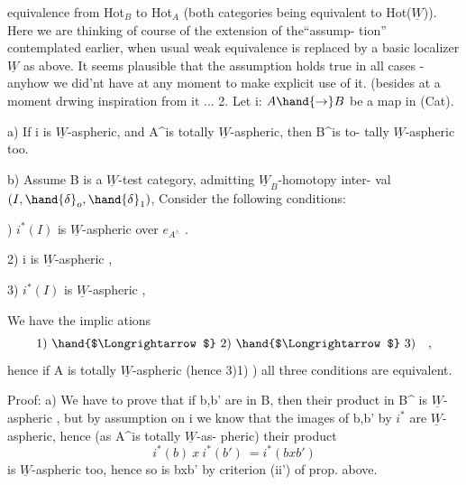 equivalence from Hot$_B$ to Hot$_A$  (both categories being equivalent to
Hot($\underline{W}$)).  Here we are thinking of course of the extension of the``assump-%
tion'' contemplated earlier,  when usual weak equivalence is replaced by
a basic localizer $\underline{W}$ as above.  It seems plausible that the assumption
holds true in all cases  -  anyhow we did'nt have at any moment to make
explicit use of it. (besides at a moment drwing inspiration from it ...\hand{)}
\hand{\uline{\textcolor{black}{Proposition}}} 2.   Let  i: $A\hand{\to} B$ be a map in (Cat).

a)  If i is $\underline{W}$-aspheric,  and A\^{}is totally $\underline{W}$-aspheric,  then B\^{}is to-%
tally $\underline{W}$-aspheric too.

b)  Assume  B is a $\underline{W}$-test category,  admitting   $\underline{W}_B$-homotopy  inter-%
val$(I,\hand{\delta}_o,\hand{\delta}_1)$,  Consider the following conditions:

)  $i^*(I)$ is $\underline{W}$-aspheric over $e_{A^\wedge}$ . 

2)  i is $\underline{W}$-aspheric ,

3)  $i^*(I)$  is $\underline{W}$-aspheric ,  

We have the implic ations
\[ 1)\ \hand{$\Longrightarrow$}\ 2)\ \hand{$\Longrightarrow$}\ 3) \quad , \]
hence if A is totally $\underline{W}$-aspheric (hence  3)\hand{$\Longrightarrow$}1) )  all three conditions
are equivalent.

Proof:   a)  We have to prove that if b,b' are in B,  then
their product in B\^{} is $\underline{W}$-aspheric ,  but by assumption on i we know that
the images of b,b' by $i^*$  are $\underline{W}$-aspheric,  hence (as A\^{}is totally $\underline{W}$-as-%
pheric)  their product
\[ i^*(b) \ x\ i^*(b') \ = i^*(bxb') \]
is $\underline{W}$-aspheric too, hence so is bxb'  by criterion (ii') of prop. above.

